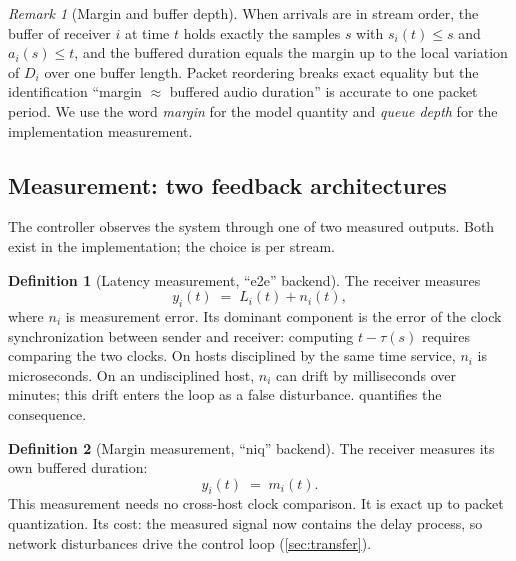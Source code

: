 \documentclass[11pt, a4paper]{article}
\theoremstyle{definition}
\newtheorem{definition}{Definition}[section]
\theoremstyle{plain}
\theoremstyle{remark}
\newtheorem{remark}{Remark}[section]
\begin{document}
\begin{remark}[Margin and buffer depth]\label{rem:margin-queue}
When arrivals are in stream order, the buffer of receiver $i$ at time $t$
holds exactly the samples $s$ with $s_i(t) \le s$ and $a_i(s) \le t$, and
the buffered duration equals the margin up to the local variation of $D_i$
over one buffer length.  Packet reordering breaks exact equality but the
identification ``margin $\approx$ buffered audio duration'' is accurate to
one packet period.  We use the word \emph{margin} for the model quantity
and \emph{queue depth} for the implementation measurement.
\end{remark}

\subsection{Measurement: two feedback architectures}\label{sec:measurement}

The controller observes the system through one of two measured outputs.
Both exist in the implementation; the choice is per stream.

\begin{definition}[Latency measurement, ``e2e'' backend]\label{def:meas-e2e}
The receiver measures
\begin{equation}\label{eq:meas-e2e}
  y_i(t) \;=\; L_i(t) + n_i(t),
\end{equation}
where $n_i$ is measurement error.  Its dominant component is the error of
the clock synchronization between sender and receiver: computing
$t - \tau(s)$ requires comparing the two clocks.  On hosts disciplined by
the same time service, $n_i$ is microseconds.  On an undisciplined host,
$n_i$ can drift by milliseconds over minutes; this drift enters the loop
as a false disturbance.   quantifies the consequence.
\end{definition}

\begin{definition}[Margin measurement, ``niq'' backend]\label{def:meas-niq}
The receiver measures its own buffered duration:
\begin{equation}\label{eq:meas-niq}
  y_i(t) \;=\; m_i(t).
\end{equation}
This measurement needs no cross-host clock comparison.  It is exact up to
packet quantization.  Its cost: the measured signal now contains the
delay process, so network disturbances drive the control loop
(\cref{sec:transfer}).
\end{definition}
\end{document}
